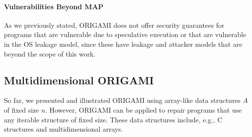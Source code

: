 \paragraph*{Vulnerabilities Beyond MAP} As we previously stated, ORIGAMI does not offer security guarantees for programs that are vulnerable due to speculative execution or that are vulnerable in the OS leakage model, since these have leakage and attacker models that are beyond the scope of this work.


\subsection{Multidimensional ORIGAMI}
So far, we presented and illustrated ORIGAMI using array-like data structures $A$ of fixed size $n$. However, ORIGAMI can be applied to repair programs that use any iterable structure of fixed size. These data structures include, e.g., C structures and multidimensional arrays. 


